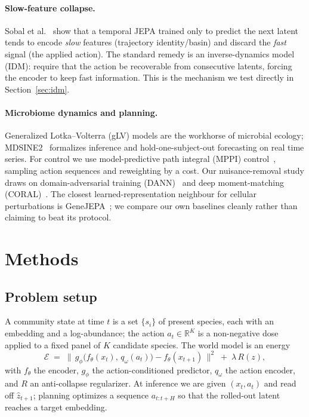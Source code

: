 \documentclass[11pt]{article}
\begin{document}
\paragraph{Slow-feature collapse.} Sobal et al.~\cite{sobal2022} show that a temporal JEPA
trained only to predict the next latent tends to encode \emph{slow} features
(trajectory identity/basin) and discard the \emph{fast} signal (the applied
action). The standard remedy is an inverse-dynamics model (IDM): require that
the action be recoverable from consecutive latents, forcing the encoder to keep
fast information. This is the mechanism we test directly in
Section~\ref{sec:idm}.

\paragraph{Microbiome dynamics and planning.} Generalized Lotka--Volterra (gLV)
models are the workhorse of microbial ecology; MDSINE2~\cite{mdsine2} formalizes
inference and hold-one-subject-out forecasting on real time series. For control
we use model-predictive path integral (MPPI) control~\cite{williams2017mppi},
sampling action sequences and reweighting by a cost. Our nuisance-removal study
draws on domain-adversarial training (DANN)~\cite{ganin2015dann} and deep
moment-matching (CORAL)~\cite{sun2016coral}. The closest learned-representation
neighbour for cellular perturbations is GeneJEPA~\cite{genejepa2025}; we compare
our own baselines cleanly rather than claiming to beat its protocol.

\section{Methods}

\subsection{Problem setup}
A community state at time $t$ is a set $\{s_i\}$ of present species, each with an
embedding and a log-abundance; the action $a_t\in\mathbb{R}^K$ is a non-negative
dose applied to a fixed panel of $K$ candidate species. The world model is an
energy
\begin{equation}
\mathcal{E} \;=\; \big\lVert\, g_\phi\!\big(f_\theta(x_t),\, q_\omega(a_t)\big)
- f_\theta(x_{t+1}) \,\big\rVert^2 \;+\; \lambda\, R(z),
\label{eq:energy}
\end{equation}
with $f_\theta$ the encoder, $g_\phi$ the action-conditioned predictor,
$q_\omega$ the action encoder, and $R$ an anti-collapse regularizer. At
inference we are given $(x_t, a_t)$ and read off $\hat z_{t+1}$; planning
optimizes a sequence $a_{t:t+H}$ so that the rolled-out latent reaches a target
embedding.
\end{document}

